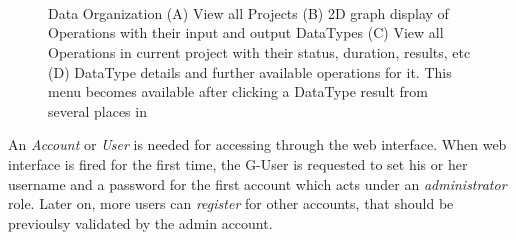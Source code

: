  \begin{figure}[!htbp]
    \centering
    \\
    \\
    \\
    \caption{\TVB Data Organization
    (A) View all Projects
    (B) 2D graph display of Operations with their input and output DataTypes 
    (C) View all Operations in current project with their status, duration, results, etc
    (D) DataType details and further available operations for it. This menu becomes available after clicking a DataType result from several places in \TVB }
        \label{fig:project}
\end{figure}

    An \emph{Account} or \emph{User} is needed for accessing \TVB through
    the web interface.  When \TVB web interface is fired for the first
    time, the G-User is requested to set his or her username and a
    password for the first account which acts under an
    \emph{administrator} role. Later on, more users can \emph{register}
    for other accounts, that should be previoulsy validated by the admin
    account.

